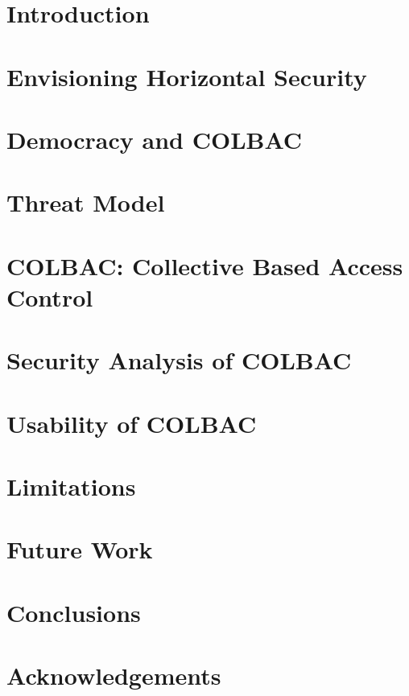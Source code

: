 \documentclass[sigconf]{acmart}
\theoremstyle{mydef}
\begin{document}
\section{Introduction}
\label{sec:introduction}


\section{Envisioning Horizontal Security}
\label{sec:envisioning}


\section{Democracy and COLBAC}
\label{sec:democracy}


\section{Threat Model}
\label{sec:threat_model}


\section{COLBAC: Collective Based Access Control}
\label{sec:colbac}


\section{Security Analysis of COLBAC}
\label{sec:security_analysis}


\section{Usability of COLBAC}
\label{sec:usability}


\section{Limitations}
\label{sec:limitations}


\section{Future Work}
\label{sec:future_work}


\section{Conclusions}
\label{sec:conclusion}
\balance


\section{Acknowledgements}




\end{document}
